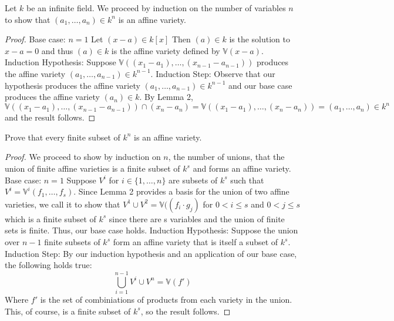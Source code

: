 \documentclass{article}
\newenvironment{problem}[2][Problem]{\begin{trivlist}
\item[\hskip \labelsep {\bfseries #1}\hskip \labelsep {\bfseries #2.}]}{\end{trivlist}}
\begin{document}
\begin{problem}{(6a)}
Let $k$ be an infinite field. We proceed by induction on the number of variables $n$ to show that  $(a_1,\dots,a_n)\in k^n$ is an affine variety.
\end{problem}
\begin{proof}
Base case: $n=1$ \newline
Let $(x-a) \in k[x]$ Then $(a)\in k$ is the solution to $x-a=0$ and thus $(a) \in k$ is the affine variety defined by $\mathbb{V}(x-a)$. \newline
Induction Hypothesis: Suppose $\mathbb{V}((x_1-a_1),\dots,(x_{n-1}-a_{n-1}))$ produces the affine variety $(a_1,\dots,a_{n-1})\in k^{n-1}$. \newline
Induction Step: Observe that our hypothesis produces the affine variety $(a_1,\dots,a_{n-1})\in k^{n-1}$ and our base case produces the affine variety $(a_n) \in k$. By Lemma 2, $\mathbb{V}((x_1-a_1),\dots,(x_{n-1}-a_{n-1})) \cap (x_n-a_n) = \mathbb{V}((x_1 - a_1),\dots,(x_n-a_n)) = (a_1,\dots,a_n) \in k^n$ and the result follows.
\end{proof}
\begin{problem}{(6b)}
Prove that every finite subset of $k^n$ is an affine variety.
\end{problem}
\begin{proof}
We proceed to show by induction on $n$, the number of unions, that the union of finite affine varieties is a finite subset of $k^s$ and forms an affine variety.\newline
Base case: $n=1$\newline
Suppose $V^i$ for $i \in \{1,\dots,n\}$ are subsets of $k^s$ such that $V^i=\mathbb{V}^i(f_1,\dots,f_s)$.
Since Lemma 2 provides a basis for the union of two affine varieties, we call it to show that $V^1 \cup V^2= \mathbb{V}((f_i\cdot g_j)$ for $0<i\leq s$ and $0<j\leq s$ which is a finite subset of $k^s$ since there are s variables and the union of finite sets is finite. Thus, our base case holds.\newline
Induction Hypothesis: Suppose the union over $n-1$ finite subsets of $k^s$ form an affine variety that is itself a subset of $k^s$.\newline
Induction Step: By our induction hypothesis and an application of our base case, the following holds true: 
$$\bigcup^{n-1}_{i=1}V^i \cup V^n = \mathbb{V}(f')$$
Where $f'$ is the set of combiniations of products from each variety in the union. This, of course, is a finite subset of $k^s$, so the result follows.
\end{proof}
\end{document}
